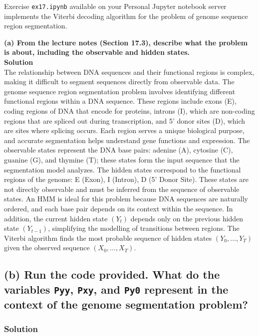 Exercise \texttt{ex17.ipynb} available on your Personal Jupyter notebook server implements the Viterbi decoding
algorithm for the problem of genome sequence region segmentation.

\textbf{(a) From the lecture notes (Section 17.3), describe what the problem is about, including the observable and hidden states.} \\

\textbf{Solution} \\

The relationship between DNA sequences and their functional regions is complex, making it
difficult to segment sequences directly from observable data. The genome sequence region
segmentation problem involves identifying different functional regions within a DNA sequence.
These regions include exons (E), coding regions of DNA that encode for proteins, introns (I),
which are non-coding regions that are spliced out during transcription, and 5’ donor sites (D),
which are sites where splicing occurs.  Each region serves a unique biological purpose, and
accurate segmentation helps understand gene functions and expression.  The observable states
represent the DNA base pairs: adenine (A), cytosine (C), guanine (G), and thymine (T); these
states form the input sequence that the segmentation model analyzes.  The hidden states
correspond to the functional regions of the genome: E (Exon), I (Intron), D (5’ Donor
Site).  These states are not directly observable and must be inferred from the sequence of
observable states.  An HMM is ideal for this problem because DNA sequences are naturally
ordered, and each base pair depends on its context within the sequence.  In addition, the
current hidden state $(Y_t)$ depends only on the previous hidden state $(Y_{t-1})$, simplifying
the modelling of transitions between regions.  The Viterbi algorithm finds the most probable
sequence of hidden states $(Y_0,\dots,Y_T)$ given the observed sequence $(X_0,\dots,X_T)$.

\subsection*{(b) Run the code provided. What do the variables \texttt{Pyy}, \texttt{Pxy}, and \texttt{Py0} represent in the context of the genome segmentation problem?}

\subsubsection*{Solution}

